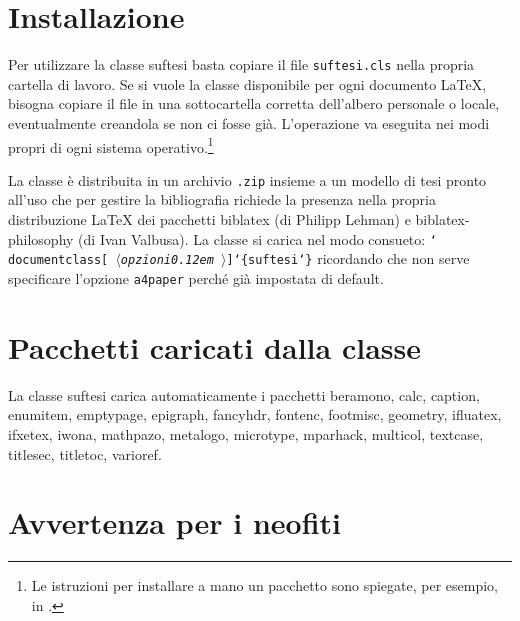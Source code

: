 \documentclass{suftesi}
\DeclareRobustCommand*{\cs}[1]{\texttt{\char`\\#1}}
\DeclareRobustCommand*{\ar}[1]{\texttt{\char`\{#1\char`\}}}
\DeclareRobustCommand*{\oar}[1]{\texttt{[#1]}}
\DeclareRobustCommand*{\meta}[1]{%
  $\langle${\normalfont\itshape#1\kern0.12em }$\rangle$}
\DeclareRobustCommand*{\oarm}[1]{\oar{\meta{#1}}}
\newcommand*{\option}{\texttt}
\newcommand{\pack}{\textsf}
\newcommand*{\File}{\texttt}
\def\suftesi{\textsf{suftesi}}
\newenvironment{ttquote}
  {\genquote[\ttfamily\microtypesetup{activate=false}]}
  {\endgenquote}
\begin{document}
\section*{Installazione}

Per utilizzare la classe \suftesi{} basta copiare il file \File{suftesi.cls} nella propria cartella di lavoro. Se si vuole la classe disponibile per ogni documento \LaTeX{}, bisogna copiare il file in una sottocartella corretta dell'albero personale o locale, eventualmente creandola se non ci fosse già. L'operazione va eseguita nei modi propri di ogni sistema operativo.\footnote{Le istruzioni per installare a mano un pacchetto sono spiegate, per esempio, in \cite{Pantieri:2010}.}

La classe è distribuita in un archivio \File{.zip} insieme a un modello di tesi pronto all'uso che per gestire la bibliografia richiede la presenza nella propria distribuzione \LaTeX{} dei pacchetti \pack{biblatex} (di Philipp Lehman) e \pack{biblatex-philosophy} (di Ivan Valbusa).
La classe si carica nel modo consueto:
\begin{ttquote}
\cs{documentclass}\oarm{opzioni}\ar{suftesi}
\end{ttquote}
ricordando che non serve specificare l'opzione \option{a4paper} perché già impostata di default.

\section*{Pacchetti caricati dalla classe}

La classe \suftesi{} carica automaticamente i pacchetti \pack{beramono}, 
\pack{calc}, \pack{caption}, \pack{enumitem}, \pack{emptypage}, \pack{epigraph}, \pack{fancyhdr}, \pack{fontenc},  \pack{footmisc}, \pack{geometry}, \pack{ifluatex}, \pack{ifxetex}, \pack{iwona}, \pack{mathpazo}, \pack{metalogo}, \pack{microtype}, \pack{mparhack}, \pack{multicol},  \pack{textcase}, \pack{titlesec}, \pack{titletoc}, \pack{varioref}.


\section*{Avvertenza per i neofiti}
\end{document}
